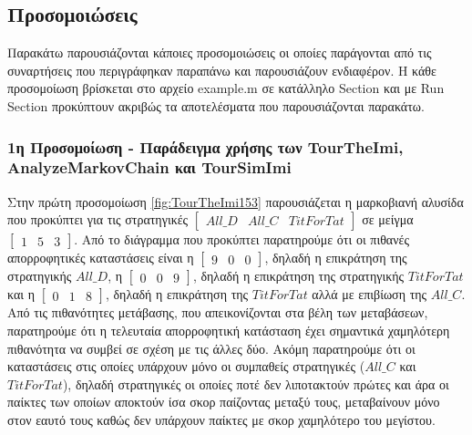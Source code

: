 \documentclass[12pt]{article}
\begin{document}
\subsection{Προσομοιώσεις}
Παρακάτω παρουσιάζονται κάποιες προσομοιώσεις οι οποίες παράγονται από τις συναρτήσεις που περιγράφηκαν παραπάνω και παρουσιάζουν ενδιαφέρον. Η κάθε προσομοίωση βρίσκεται στο αρχείο example.m σε κατάλληλο Section και με Run Section προκύπτουν ακριβώς τα αποτελέσματα που παρουσιάζονται παρακάτω.
\subsubsection{1η Προσομοίωση - Παράδειγμα χρήσης των Tour\-The\-Imi, Analyze\-Markov\-Chain και Tour\-Sim\-Imi}
Στην πρώτη προσομοίωση \ref{fig:TourTheImi153} παρουσιάζεται η μαρκοβιανή αλυσίδα που προκύπτει για τις στρατηγικές $\begin{bmatrix}All\_D&All\_C&TitForTat\end{bmatrix}$ σε μείγμα $\begin{bmatrix}1&5&3\end{bmatrix}$.
Από το διάγραμμα που προκύπτει παρατηρούμε ότι οι πιθανές απορροφητικές καταστάσεις είναι η $\begin{bmatrix}9&0&0\end{bmatrix}$, δηλαδή η επικράτηση της στρατηγικής $All\_D$, η $\begin{bmatrix}0&0&9\end{bmatrix}$, δηλαδή η επικράτηση της στρατηγικής $TitForTat$ και η $\begin{bmatrix}0&1&8\end{bmatrix}$, δηλαδή η επικράτηση της $TitForTat$ αλλά με επιβίωση της $All\_C$. Από τις πιθανότητες μετάβασης, που απεικονίζονται στα βέλη των μεταβάσεων, παρατηρούμε ότι η τελευταία απορροφητική κατάσταση έχει σημαντικά χαμηλότερη πιθανότητα να συμβεί σε σχέση με τις άλλες δύο. Ακόμη παρατηρούμε ότι οι καταστάσεις στις οποίες υπάρχουν μόνο οι συμπαθείς στρατηγικές ($All\_C$ και $TitForTat$), δηλαδή στρατηγικές οι οποίες ποτέ δεν λιποτακτούν πρώτες και άρα οι παίκτες των οποίων αποκτούν ίσα σκορ παίζοντας μεταξύ τους, μεταβαίνουν μόνο στον εαυτό τους καθώς δεν υπάρχουν παίκτες με σκορ χαμηλότερο του μεγίστου.
\end{document}
